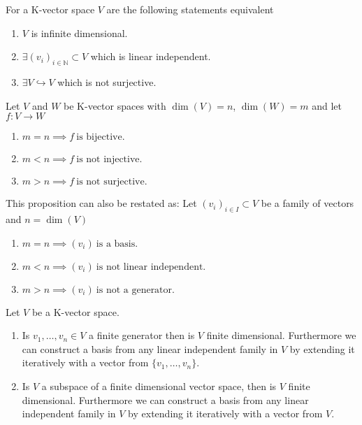 \begin{proposition}
   For a K-vector space \(V\) are the following statements equivalent
   \begin{enumerate}[label=\roman*, align=Center]
      \item \(V\) is infinite dimensional.
      \item \(\exists (v_i)_{i \in \mathbb{N}} \subset V\) which is linear independent.
      \item \(\exists V \hookrightarrow V\) which is not surjective.
   \end{enumerate}
\end{proposition}

\begin{proposition}\label{pro:dim_f}
   Let \(V\) and \(W\) be K-vector spaces with \(\dim(V) = n\), \(\dim(W) = m\) and let \(f: V \to W\)

   \begin{enumerate}[label=\roman*, align=Center]
      \item \(m = n \implies f~\text{is bijective.}\)
      \item \(m < n \implies f~\text{is not injective.}\)
      \item \(m > n \implies f~\text{is not surjective.}\)
   \end{enumerate}
\end{proposition}
\begin{remark}
   This proposition can also be restated as:
   Let \((v_i)_{i \in I} \subset V\) be a family of vectors and \(n = \dim(V)\)
   \begin{enumerate}[label=\roman*, align=Center]
      \item \(m = n \implies (v_i)~\text{is a basis.}\)
      \item \(m < n \implies (v_i)~\text{is not linear independent.}\)
      \item \(m > n \implies (v_i)~\text{is not a generator.}\)
   \end{enumerate}
\end{remark}

\begin{proposition}\label{pro:extending_family}
   Let \(V\) be a K-vector space.
   \begin{enumerate}[label=\roman*, align=Center]
      \item Is \(v_1, \ldots, v_n \in V\) a finite generator then is \(V\) finite dimensional.
         Furthermore we can construct a basis from any linear independent family in \(V\) by extending it iteratively with a vector from \(\{v_1, \ldots, v_n\}\).
      \item Is \(V\) a subspace of a finite dimensional vector space, then is \(V\) finite dimensional.
         Furthermore we can construct a basis from any linear independent family in \(V\) by extending it iteratively with a vector from \(V\).
   \end{enumerate}
\end{proposition}

